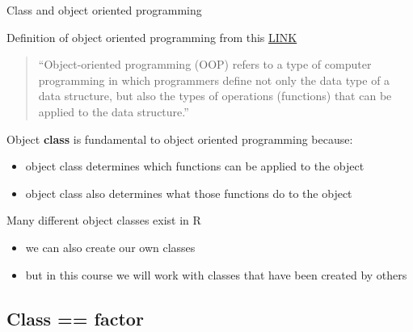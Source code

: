 \documentclass[8pt,ignorenonframetext,dvipsnames]{beamer}
\providecommand{\tightlist}{%
  \setlength{\itemsep}{0pt}\setlength{\parskip}{0pt}}
\renewcommand{\textbf}[1]{{\color{darkgray}\bfseries\fontfamily{Montserrat-TOsF}#1}}
\let\olditem\item
\renewcommand{\item}{%
  \olditem\vspace{4pt}
}
\begin{document}
\begin{frame}{Class and object oriented programming}

Definition of object oriented programming from this
\href{https://www.webopedia.com/TERM/O/object_oriented_programming_OOP.html}{LINK}

\begin{quote}
``Object-oriented programming (OOP) refers to a type of computer
programming in which programmers define not only the data type of a data
structure, but also the types of operations (functions) that can be
applied to the data structure.''
\end{quote}

Object \textbf{class} is fundamental to object oriented programming
because:

\begin{itemize}
\tightlist
\item
  object class determines which functions can be applied to the object
\item
  object class also determines what those functions do to the object
\end{itemize}

Many different object classes exist in R

\begin{itemize}
\tightlist
\item
  we can also create our own classes
\item
  but in this course we will work with classes that have been created by
  others
\end{itemize}

\end{frame}

\subsection{Class == factor}\label{class-factor}
\end{document}
